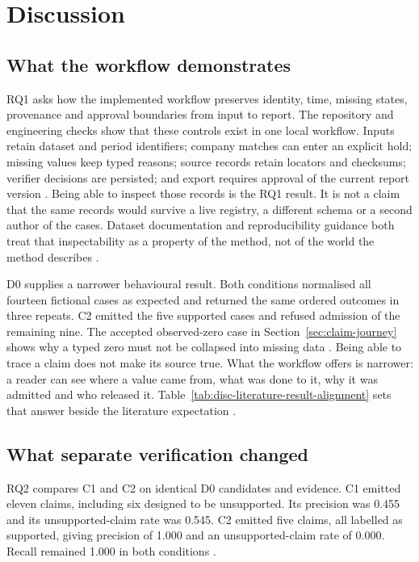 \chapter{Discussion}
\section{What the workflow demonstrates}

RQ1 asks how the implemented workflow preserves identity, time, missing states, provenance and
approval boundaries from input to report. The repository and engineering checks show that these
controls exist in one local workflow. Inputs retain dataset and period identifiers; company matches
can enter an explicit hold; missing values keep typed reasons; source records retain locators and
checksums; verifier decisions are persisted; and export requires approval of the current report
version \citep{hevner2004design,peffers2007dsrm}. Being able to inspect those records is the RQ1
result. It is not a claim that the same records would survive a live registry, a different schema or
a second author of the cases. Dataset documentation and reproducibility guidance both treat that
inspectability as a property of the method, not of the world the method describes
\citep{gebru2021datasheets,pineau2021reproducibility}.

D0 supplies a narrower behavioural result. Both conditions normalised all fourteen fictional cases
as expected and returned the same ordered outcomes in three repeats. C2 emitted the five supported
cases and refused admission of the remaining nine. The accepted observed-zero case in
Section~\ref{sec:claim-journey} shows why a typed zero must not be collapsed into missing data
\citep{gao2023alce,gao2023rarr}. Being able to trace a claim does not make its source true. What the
workflow offers is narrower: a reader can see where a value came from, what was done to it, why it
was admitted and who released it. Table~\ref{tab:disc-literature-result-alignment} sets that answer
beside the literature expectation \citep{gao2023rarr,pineau2021reproducibility}.



\section{What separate verification changed}

RQ2 compares C1 and C2 on identical D0 candidates and evidence. C1 emitted eleven claims, including
six designed to be unsupported. Its precision was 0.455 and its unsupported-claim rate was 0.545. C2
emitted five claims, all labelled as supported, giving precision of 1.000 and an unsupported-claim
rate of 0.000. Recall remained 1.000 in both conditions \citep{gao2023alce,gao2023rarr}.

